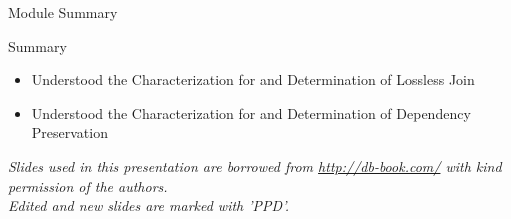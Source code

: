 \documentclass[aspectratio=169, xcolor=dvipsnames]{beamer}
\begin{document}
\begin{frame}{Module Summary}
    \begin{block}{Summary}
        \begin{itemize}[<+->]
            \item Understood the Characterization for and Determination of Lossless Join
            \item Understood the Characterization for and Determination of Dependency Preservation
        \end{itemize}
    \end{block}
    \vspace{2em}
    \begin{center}
    \small \textit{Slides used in this presentation are borrowed from \url{http://db-book.com/} with kind permission of the authors.} \\
    \small \textit{Edited and new slides are marked with 'PPD'.}
    \end{center}
\end{frame}
\end{document}
